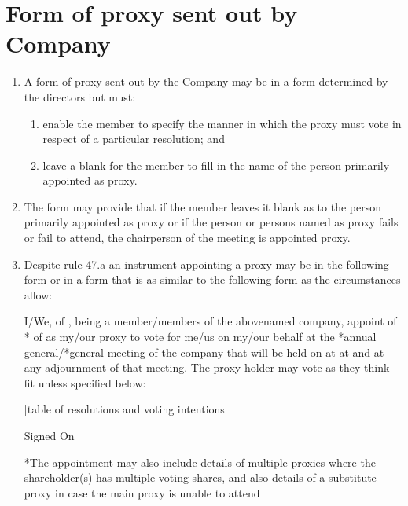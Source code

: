 \section{Form of proxy sent out by Company}

\begin{enumerate}[label=(\alph*)]
    \item A form of proxy sent out by the Company may be in a form determined by the directors but must:
    \begin{enumerate}[label=(\roman*)]
        \item enable the member to specify the manner in which the proxy must vote in respect of a particular resolution; and
        \item leave a blank for the member to fill in the name of the person primarily appointed as proxy.
    \end{enumerate}
    
    \item The form may provide that if the member leaves it blank as to the person primarily appointed as proxy or if the person or persons named as proxy fails or fail to attend, the chairperson of the meeting is appointed proxy.
    
    \item Despite rule 47.a an instrument appointing a proxy may be in the following form or in a form that is as similar to the following form as the circumstances allow:
    
    I/We, \underline{\hspace{3cm}} of \underline{\hspace{3cm}}, being a member/members of the abovenamed company, appoint \underline{\hspace{3cm}} of \underline{\hspace{3cm}}* \underline{\hspace{3cm}} of \underline{\hspace{3cm}} as my/our proxy to vote for me/us on my/our behalf at the *annual general/*general meeting of the company that will be held on \underline{\hspace{3cm}} at \underline{\hspace{3cm}} at \underline{\hspace{1cm}} and at any adjournment of that meeting. The proxy holder may vote as they think fit unless specified below:
    
    [table of resolutions and voting intentions]
    
    Signed On \underline{\hspace{3cm}}
    
    *The appointment may also include details of multiple proxies where the shareholder(s) has multiple voting shares, and also details of a substitute proxy in case the main proxy is unable to attend
\end{enumerate} 